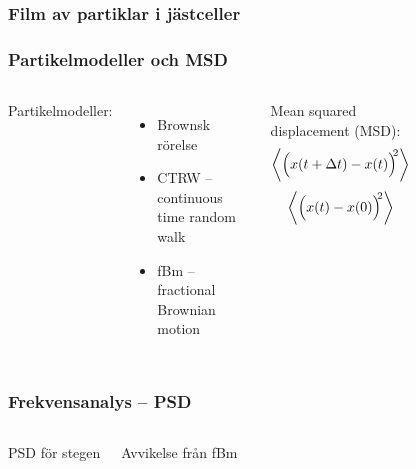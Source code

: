 \documentclass[swedish]{beamer}
\begin{document}
\begin{frame}
\frametitle{Film av partiklar i jästceller}

\centering
{}


\end{frame}


\begin{frame}
\frametitle{Partikelmodeller och MSD}
\begin{columns}[c]

Partikelmodeller:
\begin{itemize}[label={$\bullet$}]
    \item Brownsk rörelse
    \item CTRW -- continuous time random walk
    \item fBm -- fractional Brownian motion
\end{itemize}
\vspace{2mm}

Mean squared displacement (MSD):
\vspace{-2mm}
\[
\ev{\Big( x(t+\Delta{t})-x(t) \Big)^{\!\!2}}
\]
\[
\ev{\Big( x(t)-x(0) \Big)^{\!\!2} }
\]




\begin{figure} %
\resizebox{1\textwidth}{!}{
}
\end{figure}

\end{columns}
\end{frame}

\begin{frame}
\frametitle{Frekvensanalys -- PSD}
\begin{columns}



PSD för stegen 
\vspace{1cm}

Avvikelse från fBm


\begin{figure} %
\resizebox{1\textwidth}{!}{
}
\end{figure}

\end{columns}
\end{frame}
\end{document}
